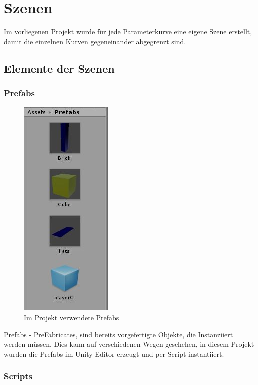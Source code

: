 
\chapter{Szenen}
\label{Szenen}

Im vorliegenen Projekt wurde für jede Parameterkurve eine eigene Szene erstellt, damit die einzelnen Kurven gegeneinander abgegrenzt sind.

\section{Elemente der Szenen}

\subsection{Prefabs}

\begin{figure}[h!]
	\centering
	\includegraphics[scale=1]{bilder/prefabs.jpg}
	\caption{Im Projekt verwendete Prefabs}
\end{figure}

Prefabs - PreFabricates, sind bereits vorgefertigte Objekte, die Instanziiert werden müssen. Dies kann auf verschiedenen Wegen geschehen, in diesem Projekt wurden die Prefabs im Unity Editor erzeugt und per Script instantiiert.


\subsection{Scripts}

